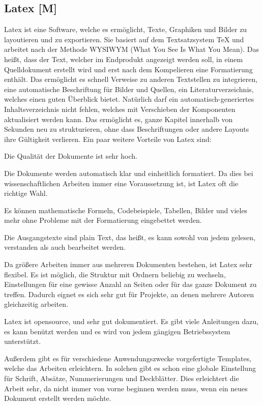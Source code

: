 \subsection{Latex [M]} 


Latex ist eine Software, welche es ermöglicht, Texte, Graphiken und Bilder zu layoutieren und zu exportieren. Sie basiert auf dem Textsatzsystem TeX und arbeitet nach der Methode WYSIWYM (What You See Is What You Mean). Das heißt, dass der Text, welcher im Endprodukt angezeigt werden soll, in einem Quelldokument erstellt wird und erst nach dem Kompelieren eine Formatierung enthält. Das ermöglicht es schnell Verweise zu anderen Textstellen zu integrieren, eine automatische Beschriftung für Bilder und Quellen, ein Literaturverzeichnis, welches einen guten Überblick bietet. Natürlich darf ein automatisch-generiertes Inhaltsverzeichnis nicht fehlen, welches mit Verschieben der Komponenten aktualisiert werden kann. Das ermöglicht es, ganze Kapitel innerhalb von Sekunden neu zu strukturieren, ohne dass Beschriftungen oder andere Layouts ihre Gültigkeit verlieren. Ein paar weitere Vorteile von Latex sind:


\begin{compactitem}
\item Die Qualität der Dokumente ist sehr hoch.
\item Die Dokumente werden automatisch klar und einheitlich formatiert. Da dies bei wissenschaftlichen Arbeiten immer eine Voraussetzung ist, ist Latex oft die richtige Wahl.
\item Es können mathematische Formeln, Codebeispiele, Tabellen, Bilder und vieles mehr ohne Probleme mit der Formatierung eingebettet werden.
\item Die Ausgangstexte sind plain Text, das heißt, es kann sowohl von jedem gelesen, verstanden als auch bearbeitet werden.
\item Da größere Arbeiten immer aus mehreren Dokumenten bestehen, ist Latex sehr flexibel. Es ist möglich, die Struktur mit Ordnern beliebig zu wechseln, Einstellungen für eine gewisse Anzahl an Seiten oder für das ganze Dokument zu treffen. Dadurch eignet es sich sehr gut für Projekte, an denen mehrere Autoren gleichzeitig arbeiten.
\item Latex ist opensource, und sehr gut dokumentiert. Es gibt viele Anleitungen dazu, es kann benützt werden und es wird von jedem gängigen Betriebssystem unterstützt.
\item Außerdem gibt es für verschiedene Anwendungszwecke vorgefertigte Templates, welche das Arbeiten erleichtern. In solchen gibt es schon eine globale Einstellung für Schrift, Absätze, Nummerierungen und Deckblätter. Dies erleichtert die Arbeit sehr, da nicht immer von vorne beginnen werden muss, wenn ein neues Dokument erstellt werden möchte.
\end{compactitem}


